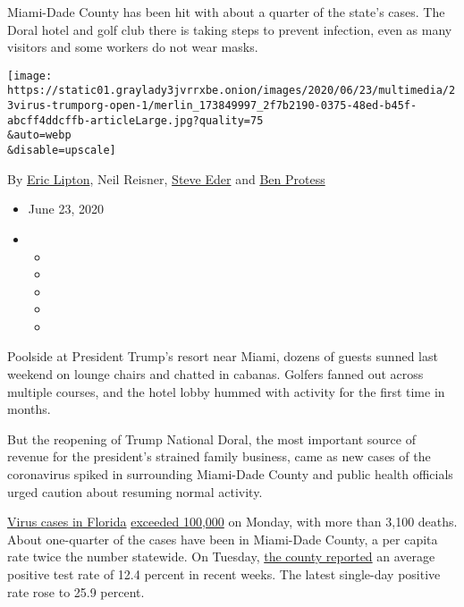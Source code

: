 Miami-Dade County has been hit with about a quarter of the state's
cases. The Doral hotel and golf club there is taking steps to prevent
infection, even as many visitors and some workers do not wear masks.

\texttt{[image: https://static01.graylady3jvrrxbe.onion/images/2020/06/23/multimedia/23virus-trumporg-open-1/merlin\_173849997\_2f7b2190-0375-48ed-b45f-abcff4ddcffb-articleLarge.jpg?quality=75\\\&auto=webp\\\&disable=upscale]}

By \href{https://www.nytimes3xbfgragh.onion/by/eric-lipton}{Eric
Lipton}, Neil Reisner,
\href{https://www.nytimes3xbfgragh.onion/by/steve-eder}{Steve Eder} and
\href{https://www.nytimes3xbfgragh.onion/by/ben-protess}{Ben Protess}

\begin{itemize}
\item
  June 23, 2020
\item
  \begin{itemize}
  \item
  \item
  \item
  \item
  \item
  \end{itemize}
\end{itemize}

Poolside at President Trump's resort near Miami, dozens of guests sunned
last weekend on lounge chairs and chatted in cabanas. Golfers fanned out
across multiple courses, and the hotel lobby hummed with activity for
the first time in months.

But the reopening of Trump National Doral, the most important source of
revenue for the president's strained family business, came as new cases
of the coronavirus spiked in surrounding Miami-Dade County and public
health officials urged caution about resuming normal activity.

\href{https://www.nytimes3xbfgragh.onion/2020/06/26/nyregion/florida-coronavirus-ny.html}{Virus
cases in Florida}
\href{https://www.nytimes3xbfgragh.onion/interactive/2020/us/florida-coronavirus-cases.html}{exceeded
100,000} on Monday, with more than 3,100 deaths. About one-quarter of
the cases have been in Miami-Dade County, a per capita rate twice the
number statewide. On Tuesday,
\href{http://www.miamidade.gov/information/library/2020-06-23-new-normal-dashboard.pdf}{the
county reported} an average positive test rate of 12.4 percent in recent
weeks. The latest single-day positive rate rose to 25.9 percent.

